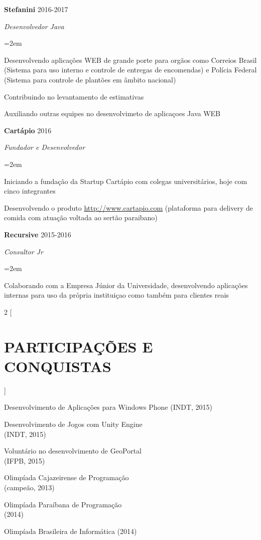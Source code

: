 \documentclass[paper=a4,fontsize=14pt]{article}
\let\olditemize\itemize
\let\endolditemize\enditemize
\renewenvironment{itemize}{%
    \small
    \olditemize
}{%
    \endolditemize
}
\newcommand{\NewPart}[1]{ \section*{\large \uppercase{#1}}}
\newcommand{\EducationEntry}[4]{
        \noindent \textbf{#1} \hfill            %
        \colorbox{White}{%
            \parbox{6em}{%
            \hfill\color{Black}#2}} \par        %
        \noindent \textit{#3} \par          %
        \noindent\hangindent=2em\hangafter=0 \small #4  %
        \normalsize \par}
\newcommand{\WorkEntry}[4]{                     %
        \noindent \textbf{#1} \hfill                %
        \colorbox{White}{\color{Black}#2} \par          %
        \noindent \textit{#3} \par              %
        \noindent\hangindent=2em\hangafter=0 \small #4      %
        \normalsize \par \vspace*{.5em}}
\begin{document}
\WorkEntry{Stefanini}{2016-2017}{Desenvolvedor Java}{
\begin{itemize}
    \item Desenvolvendo aplicações WEB de grande porte para orgãos como Correios Brasil (Sistema para uso interno e controle de entregas de encomendas) e Polícia Federal (Sistema para controle de plantões em âmbito nacional)
    \item Contribuindo no levantamento de estimativas
    \item Auxiliando outras equipes no desenvolvimeto de aplicaçoes Java WEB
\end{itemize}
}

\WorkEntry{Cartápio}{2016}{Fundador e Desenvolvedor}{
\begin{itemize}
    \item Iniciando a fundação da Startup Cartápio com colegas universitários, hoje com cinco integrantes
    \item Desenvolvendo o produto \url{http://www.cartapio.com} (plataforma para delivery de comida com atuação voltada ao sertão paraibano)
\end{itemize}
}

\WorkEntry{Recursive}{2015-2016}{Consultor Jr}{
\begin{itemize}
    \item Colaborando com a Empresa Júnior da Universidade, desenvolvendo aplicações internas para uso da própria instituiçao como também para clientes reais
\end{itemize}
}

\begin{multicols}{2}
[
\NewPart{Participações e Conquistas}{}
]
\begin{itemize}
    \item Desenvolvimento de Aplicações para Windows Phone (INDT, 2015)
    \item Desenvolvimento de Jogos com Unity Engine \\(INDT, 2015)     
    \item Voluntário no desenvolvimento de GeoPortal \\(IFPB, 2015)
\end{itemize}
\columnbreak
\begin{itemize}
    \item Olimpíada Cajazeirense de Programação \\(campeão, 2013)
    \item Olimpíada Paraíbana de Programação \\(2014)
    \item Olimpíada Brasileira de Informática (2014)
\end{itemize}
\end{multicols}
\end{document}
